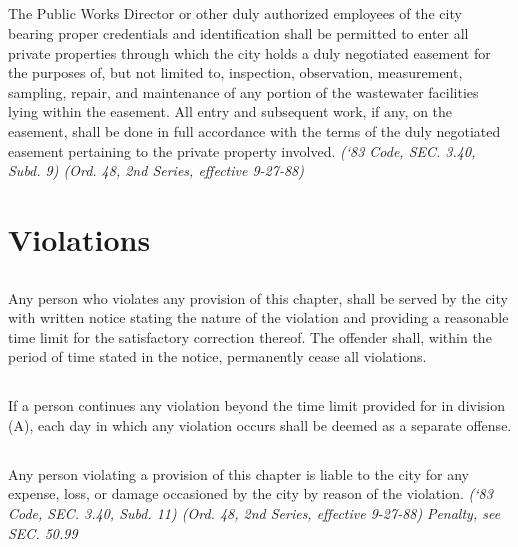 \documentclass[code.tex]{subfiles}
\begin{document}
\subsection{}
The Public Works Director or other duly authorized employees of the city bearing proper credentials and identification shall be permitted to enter all private properties through which the city holds a duly negotiated easement for the purposes of, but not limited to, inspection, observation, measurement, sampling, repair, and maintenance of any portion of the wastewater facilities lying within the easement.  All entry and subsequent work, if any, on the easement, shall be done in full accordance with the terms of the duly negotiated easement pertaining to the private property involved.\newline
\emph{(‘83 Code, SEC. 3.40, Subd. 9) (Ord. 48, 2nd Series, effective 9-27-88)}
\section{Violations}
\subsection{}
Any person who violates any provision of this chapter, shall be served by the city with written notice stating the nature of the violation and providing a reasonable time limit for the satisfactory correction thereof.  The offender shall, within the period of time stated in the notice, permanently cease all violations.
\subsection{}
If a person continues any violation beyond the time limit provided for in division (A), each day in which any violation occurs shall be deemed as a separate offense.
\subsection{}
Any person violating a provision of this chapter is liable to the city for any expense, loss, or damage occasioned by the city by reason of the violation.\newline
\emph{(‘83 Code, SEC. 3.40, Subd. 11) (Ord. 48, 2nd Series, effective 9-27-88)}\newline
\emph{Penalty, see SEC. 50.99}
\end{document}
